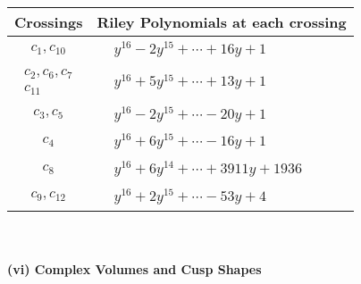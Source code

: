 \documentclass[1p]{elsarticle_modified}
\theoremstyle{definition}
\begin{document}
\begin{tabular}{m{50pt}|m{274pt}}
Crossings & \hspace{64pt}Riley Polynomials at each crossing \\
\hline $$\begin{aligned}c_{1},c_{10}\end{aligned}$$&$\begin{aligned}
&y^{16}-2 y^{15}+\cdots+16 y+1
\end{aligned}$\\
\hline $$\begin{aligned}c_{2},c_{6},c_{7}\\c_{11}\end{aligned}$$&$\begin{aligned}
&y^{16}+5 y^{15}+\cdots+13 y+1
\end{aligned}$\\
\hline $$\begin{aligned}c_{3},c_{5}\end{aligned}$$&$\begin{aligned}
&y^{16}-2 y^{15}+\cdots-20 y+1
\end{aligned}$\\
\hline $$\begin{aligned}c_{4}\end{aligned}$$&$\begin{aligned}
&y^{16}+6 y^{15}+\cdots-16 y+1
\end{aligned}$\\
\hline $$\begin{aligned}c_{8}\end{aligned}$$&$\begin{aligned}
&y^{16}+6 y^{14}+\cdots+3911 y+1936
\end{aligned}$\\
\hline $$\begin{aligned}c_{9},c_{12}\end{aligned}$$&$\begin{aligned}
&y^{16}+2 y^{15}+\cdots-53 y+4
\end{aligned}$\\
\hline
\end{tabular}\\~\\
\newpage\flushleft \textbf{(vi) Complex Volumes and Cusp Shapes}
\end{document}
